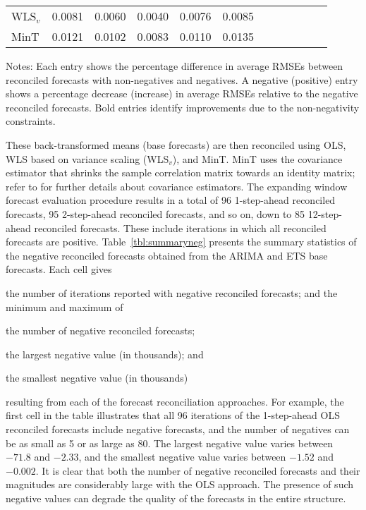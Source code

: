 \documentclass[twocolumn]{svjour3}
\begin{document}
\begin{table*}[!htb]
\begin{threeparttable}
\begin{tabular}{lrrrrrrrrrrr}
			WLS$_{v}$ & 0.0081 & 0.0060 & 0.0040 & 0.0076 & 0.0085 &  & \bm{$-0.0148$} & \bm{$-0.0131$} & \bm{$-0.0112$} & \bm{$-0.0119$} & \bm{$-0.0140$} \\
			MinT & 0.0121 & 0.0102 & 0.0083 & 0.0110 & 0.0135 &  & \bm{$-0.0149$} & \bm{$-0.0148$} & \bm{$-0.0131$} & \bm{$-0.0138$} & \bm{$-0.0152$} \\
			\bottomrule
		\end{tabular}
		\begin{tablenotes}
			\item [] Notes: Each entry shows the percentage difference in average RMSEs between reconciled forecasts with non-negatives and negatives. A negative (positive) entry shows a percentage decrease (increase) in average RMSEs relative to the negative reconciled forecasts. Bold entries identify improvements due to the non-negativity constraints.
		\end{tablenotes}
	\end{threeparttable}
\end{table*}

These back-transformed means (base forecasts) are then reconciled using OLS, WLS based on variance scaling (WLS$_{v}$), and MinT. MinT uses the covariance estimator that shrinks the sample correlation matrix towards an identity matrix; refer to \citet{Wick2018} for further details about covariance estimators. The expanding window forecast evaluation procedure results in a total of 96 1-step-ahead reconciled forecasts, 95 2-step-ahead reconciled forecasts, and so on, down to 85 12-step-ahead reconciled forecasts. These include iterations in which all reconciled forecasts are positive. Table~\ref{tbl:summaryneg} presents the summary statistics of the negative reconciled forecasts obtained from the ARIMA and ETS base forecasts. Each cell gives \begin{inparaenum}[(i)] \item the number of iterations reported with negative reconciled forecasts; and the minimum and maximum of \item the number of negative reconciled forecasts; \item the largest negative value (in thousands); and \item the smallest negative value (in thousands) \end{inparaenum} resulting from each of the forecast reconciliation approaches. For example, the first cell in the table illustrates that all 96 iterations of the 1-step-ahead OLS reconciled forecasts include negative forecasts, and the number of negatives can be as small as 5 or as large as 80. The largest negative value varies between $-71.8$ and $-2.33$, and the smallest negative value varies between $-1.52$ and $-0.002$. It is clear that both the number of negative reconciled forecasts and their magnitudes are considerably large with the OLS approach. The presence of such negative values can degrade the quality of the forecasts in the entire structure.
\end{document}
